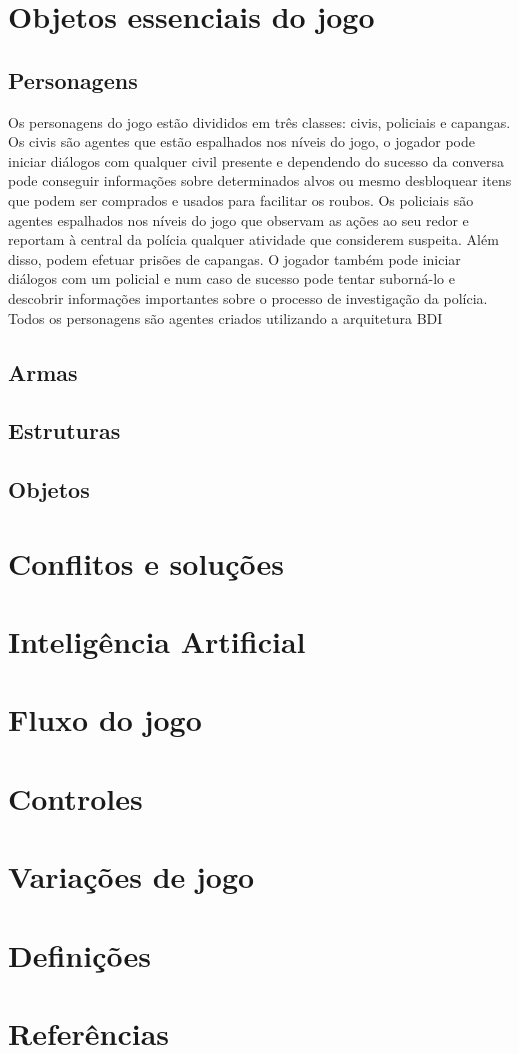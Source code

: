 \section{Objetos essenciais do jogo}

\subsection{Personagens}
Os personagens do jogo estão divididos em três classes: civis, policiais e capangas.
Os civis são agentes que estão espalhados nos níveis do jogo, o jogador pode iniciar diálogos com qualquer civil presente e dependendo do sucesso da conversa pode conseguir informações sobre determinados alvos ou mesmo desbloquear itens que podem ser comprados e usados para facilitar os roubos.
Os policiais são agentes espalhados nos níveis do jogo que observam as ações ao seu redor e reportam à central da polícia qualquer atividade que considerem suspeita. Além disso, podem efetuar prisões de capangas. O jogador também pode iniciar diálogos com um policial e num caso de sucesso pode tentar suborná-lo e descobrir informações importantes sobre o processo de investigação da polícia.
Todos os personagens são agentes criados utilizando a arquitetura BDI
\subsection{Armas}
\subsection{Estruturas}
\subsection{Objetos}

\section{Conflitos e soluções}
\section{Inteligência Artificial}
\section{Fluxo do jogo}
\section{Controles}
\section{Variações de jogo}
\section{Definições}
\section{Referências}
